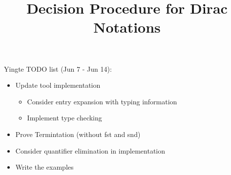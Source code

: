 \documentclass[manuscript, review, timestamp]{acmart}
\begin{document}
\title{Decision Procedure for Dirac Notations}



\begin{abstract}
\end{abstract}



\maketitle

Yingte TODO list (Jun 7 - Jun 14): 
\begin{itemize}
    \item Update tool implementation
    \begin{itemize}
        \item Consider entry expansion with typing information
        \item Implement type checking
    \end{itemize}
    \item Prove Termintation (without fst and snd)
    \item Consider quantifier elimination in implementation
    \item Write the examples
\end{itemize}
\end{document}
